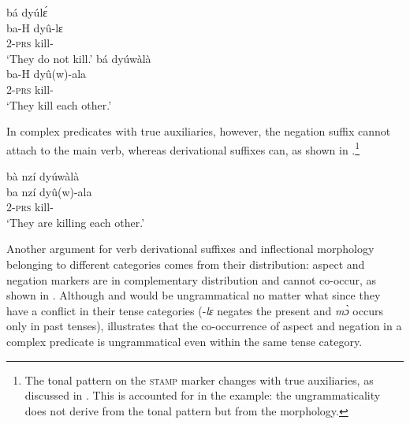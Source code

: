 \ea\label{VSuff1}
\ea  \label{VSuff1a}
  \glll  bá dyúlɛ́ \\
          ba-H dyû-lɛ \\
            2-\textsc{prs} kill-{\NEG} \\
    \trans `They do not kill.'
\ex\label{VSuff1b}
 \glll  bá dyúwàlà \\
         ba-H dyû(w)-ala\\
	2-\textsc{prs} kill-{\RECIP} \\
    \trans `They kill each other.'
\z
\z

\noindent In complex predicates with true auxiliaries, however, the negation suffix cannot attach to the main verb, whereas derivational suffixes can, as shown in .\footnote{The tonal pattern on the \textsc{stamp} marker changes with true auxiliaries, as discussed in . This is accounted for in the example: the ungrammaticality does not derive from the tonal pattern but from the morphology.}

\ea\label{VSuff2}
\ex\label{VSuff2b}
 \glll  bà nzí dyúwàlà \\
         ba nzí dyû(w)-ala\\
	2-\textsc{prs} kill-{\RECIP} \\
    \trans `They are killing each other.'
\z
\z


Another argument for verb derivational suffixes and inflectional morphology belonging to different categories comes from their distribution: aspect and negation markers are in complementary distribution and cannot co-occur, as shown in . Although  and  would be ungrammatical no matter what since they have a conflict in their tense categories (-{\itshape lɛ} negates the present and {\itshape mɔ̀} occurs only in past tenses),  illustrates that the co-occurrence of aspect and negation in a complex predicate is ungrammatical even within the same tense category.

\ea\label{VSuff3}
\z
\z

